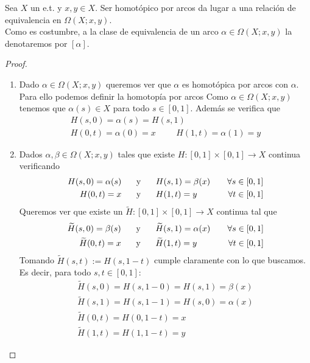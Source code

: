 \begin{lema}
    Sea $X$ un e.t. y $x,y\in X$.
    Ser homotópico por arcos da lugar a una relación de equivalencia en $\Omega(X;x,y)$.\\
    
    Como es costumbre, a la clase de equivalencia de un arco $\alpha\in\Omega(X;x,y)$ la denotaremos por $[\alpha]$.
    \begin{proof}\
        \begin{enumerate}[label=(\roman*)]
            \item Dado $\alpha \in \Omega(X;x,y)$ queremos ver que $\alpha$ es homotópica por arcos con $\alpha$. Para ello podemos definir la homotopía por arcos
            \Func{H}{[0,1]\times[0,1]}{X}{(s,t)}{\alpha(s)}
            Como $\alpha\in \Omega(X;x,y)$ tenemos que $\alpha(s)\in X$ para todo $s\in [0,1]$. Además se verifica que
            \begin{gather*}
                H(s,0) = \alpha(s)=H(s,1)\\
                H(0,t) = \alpha(0)=x \hspace{1cm} H(1,t) = \alpha(1) = y
            \end{gather*}

            \item Dados $\alpha, \beta\in \Omega(X;x,y)$ tales que existe $H:[0,1]\times [0,1]\to X$ continua verificando
            \begin{align*}
                H(s,0) = \alpha(s) \hspace{0.5cm} &\text{ y } \hspace{0.5cm} H(s,1) = \beta(x) \ \ \ &\forall s\in [0,1]\\
                H(0,t) = x  \hspace{0.5cm} &\text{ y } \hspace{0.5cm} H(1,t) = y \ \ \ &\forall t \in [0,1]
            \end{align*}
            Queremos ver que existe un $\tilde{H}:[0,1]\times[0,1]\to X$ continua tal que 
            \begin{align*}
                \tilde{H}(s,0) = \beta(s) \hspace{0.5cm} &\text{ y } \hspace{0.5cm} \tilde{H}(s,1) = \alpha(x) \ \ \ &\forall s\in [0,1]\\
                \tilde{H}(0,t) = x  \hspace{0.5cm} &\text{ y } \hspace{0.5cm} \tilde{H}(1,t) = y \ \ \ &\forall t \in [0,1]
            \end{align*}
            Tomando $\tilde{H}(s,t):=H(s, 1-t)$ cumple claramente con lo que buscamos. Es decir, para todo $s,t\in [0,1]$:
            \begin{gather*}
                \tilde{H}(s,0) = H(s, 1-0) = H(s,1) = \beta(x)\\
                \tilde{H}(s, 1) = H(s, 1-1) = H(s,0) = \alpha(x)\\
                \tilde{H}(0,t) = H(0, 1-t) = x\\
                \tilde{H}(1,t) = H(1, 1-t) = y
            \end{gather*}


\end{enumerate}
\end{proof}
\end{lema}
